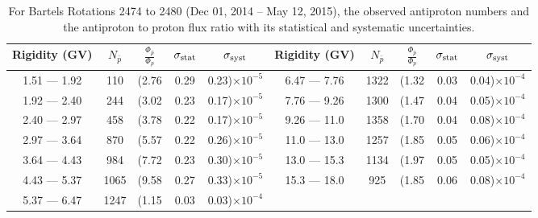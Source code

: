 \begin{table}[p] 
\renewcommand\baselinestretch{1.3}\selectfont
\setlength\tabcolsep{3pt}
\centering
\begin{tabular}{ccccc | ccccc}
\hline
\textbf{Rigidity}  (GV)  & $N_{\bar{p}}$ & $\frac{\Phi_{\bar{p}}}{\Phi_{p}}$ & $\sigma_{\rm{stat}}$ & $\sigma_{\rm{syst}}$ \hspace{1cm}   & \textbf{Rigidity}  (GV)  & $N_{\bar{p}}$ & $\frac{\Phi_{\bar{p}}}{\Phi_{p}}$ & $\sigma_{\rm{stat}}$ & $\sigma_{\rm{syst}}$ \hspace{1cm} \\ 
\hline
1.51 — 1.92   &  110                &(2.76                          &  0.29              &      0.23)$\times 10^{-5}$  & 6.47 — 7.76                &  1322                    &(1.32                                &  0.03                   &      0.04)$\times 10^{-4}$\\
1.92 — 2.40   &  244                &(3.02                          &  0.23              &      0.17)$\times 10^{-5}$  & 7.76 — 9.26                &  1300                    &(1.47                                &  0.04                   &      0.05)$\times 10^{-4}$\\
2.40 — 2.97   &  458                &(3.78                          &  0.22              &      0.17)$\times 10^{-5}$  & 9.26 — 11.0                &  1358                    &(1.70                                &  0.04                   &      0.08)$\times 10^{-4}$\\    
2.97 — 3.64   &  870                &(5.57                          &  0.22              &      0.26)$\times 10^{-5}$   & 11.0 — 13.0                 &  1257                    &(1.85                                & 0.05                   &      0.06)$\times 10^{-4}$\\    
3.64 — 4.43   &  984                &(7.72                          &  0.23              &      0.30)$\times 10^{-5}$  & 13.0 — 15.3               &  1134                    &(1.97                                &  0.05                   &      0.05)$\times 10^{-4}$\\
4.43 — 5.37   &  1065              &(9.58                          &  0.27              &      0.33)$\times 10^{-5}$  & 15.3 — 18.0               &  925                      &(1.85                                &  0.06                   &      0.08)$\times 10^{-4}$\\
5.37 — 6.47   &  1247              &(1.15                          &  0.03              &      0.03)$\times 10^{-4}$  & \\
\hline
\end{tabular}
\caption[Antiproton to proton flux ratio for Bartels Rotations 2474 to 2480]{For Bartels Rotations 2474 to 2480 (Dec 01, 2014 – May 12, 2015), the observed antiproton numbers and the antiproton to proton flux ratio with its statistical and systematic uncertainties.}
\label{TableOfDependent9}
\end{table}


